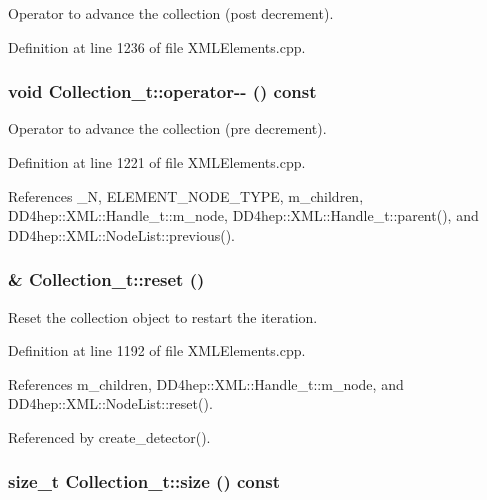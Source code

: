 Operator to advance the collection (post decrement). 

Definition at line 1236 of file XMLElements.cpp.\hypertarget{class_d_d4hep_1_1_x_m_l_1_1_collection__t_a9926d533d43a6f2d10f6935759207b1f}{
\subsubsection[{operator-\/-\/}]{\setlength{\rightskip}{0pt plus 5cm}void Collection\_\-t::operator-\/-\/ () const}}
\label{class_d_d4hep_1_1_x_m_l_1_1_collection__t_a9926d533d43a6f2d10f6935759207b1f}


Operator to advance the collection (pre decrement). 

Definition at line 1221 of file XMLElements.cpp.

References \_\-N, ELEMENT\_\-NODE\_\-TYPE, m\_\-children, DD4hep::XML::Handle\_\-t::m\_\-node, DD4hep::XML::Handle\_\-t::parent(), and DD4hep::XML::NodeList::previous().\hypertarget{class_d_d4hep_1_1_x_m_l_1_1_collection__t_adeb2667661d9b30037d28e6045068b00}{
\subsubsection[{reset}]{ \& Collection\_\-t::reset ()}}
\label{class_d_d4hep_1_1_x_m_l_1_1_collection__t_adeb2667661d9b30037d28e6045068b00}


Reset the collection object to restart the iteration. 

Definition at line 1192 of file XMLElements.cpp.

References m\_\-children, DD4hep::XML::Handle\_\-t::m\_\-node, and DD4hep::XML::NodeList::reset().

Referenced by create\_\-detector().\hypertarget{class_d_d4hep_1_1_x_m_l_1_1_collection__t_a8e5128ccacf7530ee556b2164ce9fe56}{
\subsubsection[{size}]{\setlength{\rightskip}{0pt plus 5cm}size\_\-t Collection\_\-t::size () const}}
\label{class_d_d4hep_1_1_x_m_l_1_1_collection__t_a8e5128ccacf7530ee556b2164ce9fe56}


